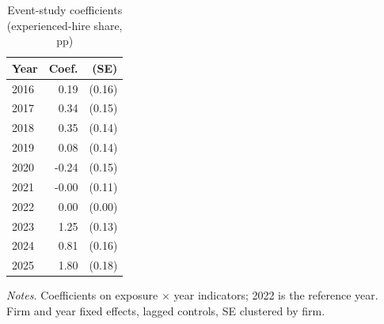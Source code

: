 \begin{table}[!htbp]\centering\footnotesize
\caption{Event-study coefficients (experienced-hire share, pp)}\label{tab:es}
\begin{tabular}{lrr}
\toprule
Year & Coef. & (SE) \\
\midrule
2016 & 0.19 & (0.16) \\
2017 & 0.34 & (0.15) \\
2018 & 0.35 & (0.14) \\
2019 & 0.08 & (0.14) \\
2020 & -0.24 & (0.15) \\
2021 & -0.00 & (0.11) \\
2022 & 0.00 & (0.00) \\
2023 & 1.25 & (0.13) \\
2024 & 0.81 & (0.16) \\
2025 & 1.80 & (0.18) \\
\bottomrule
\end{tabular}
\begin{minipage}{0.95\linewidth}\vspace{2pt}\scriptsize\textit{Notes.} Coefficients on exposure $\times$ year indicators; 2022 is the reference year. Firm and year fixed effects, lagged controls, SE clustered by firm.\end{minipage}
\end{table}